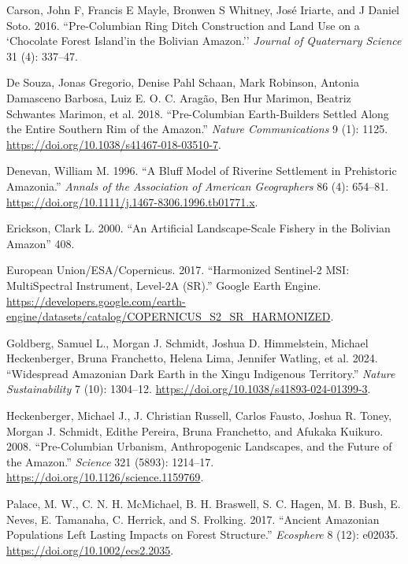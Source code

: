 \documentclass[
  letterpaper,
  DIV=11,
  numbers=noendperiod]{scrartcl}
\newlength{\cslhangindent}
\newenvironment{CSLReferences}[2] %
 {\begin{list}{}{%
  \setlength{\itemindent}{0pt}
  \setlength{\leftmargin}{0pt}
  \setlength{\parsep}{0pt}
  \ifodd #1
   \setlength{\leftmargin}{\cslhangindent}
   \setlength{\itemindent}{-1\cslhangindent}
  \fi
  \setlength{\itemsep}{#2\baselineskip}}}
 {\end{list}}
\begin{document}
\label{refs}
\begin{CSLReferences}{1}{0}
Carson, John F, Francis E Mayle, Bronwen S Whitney, José Iriarte, and J
Daniel Soto. 2016. {``Pre-Columbian Ring Ditch Construction and Land Use
on a `Chocolate Forest Island'in the Bolivian Amazon.''} \emph{Journal
of Quaternary Science} 31 (4): 337--47.

De Souza, Jonas Gregorio, Denise Pahl Schaan, Mark Robinson, Antonia
Damasceno Barbosa, Luiz E. O. C. Aragão, Ben Hur Marimon, Beatriz
Schwantes Marimon, et al. 2018. {``Pre-Columbian Earth-Builders Settled
Along the Entire Southern Rim of the Amazon.''} \emph{Nature
Communications} 9 (1): 1125.
\url{https://doi.org/10.1038/s41467-018-03510-7}.

Denevan, William M. 1996. {``A Bluff Model of Riverine Settlement in
Prehistoric Amazonia.''} \emph{Annals of the Association of American
Geographers} 86 (4): 654--81.
\url{https://doi.org/10.1111/j.1467-8306.1996.tb01771.x}.

Erickson, Clark L. 2000. {``An Artificial Landscape-Scale Fishery in the
Bolivian Amazon''} 408.

European Union/ESA/Copernicus. 2017. {``Harmonized {Sentinel-2} {MSI}:
{MultiSpectral} {Instrument}, {Level-2A} ({SR}).''} Google Earth Engine.
\url{https://developers.google.com/earth-engine/datasets/catalog/COPERNICUS_S2_SR_HARMONIZED}.

Goldberg, Samuel L., Morgan J. Schmidt, Joshua D. Himmelstein, Michael
Heckenberger, Bruna Franchetto, Helena Lima, Jennifer Watling, et al.
2024. {``Widespread Amazonian Dark Earth in the Xingu Indigenous
Territory.''} \emph{Nature Sustainability} 7 (10): 1304--12.
\url{https://doi.org/10.1038/s41893-024-01399-3}.

Heckenberger, Michael J., J. Christian Russell, Carlos Fausto, Joshua R.
Toney, Morgan J. Schmidt, Edithe Pereira, Bruna Franchetto, and Afukaka
Kuikuro. 2008. {``Pre-Columbian Urbanism, Anthropogenic Landscapes, and
the Future of the Amazon.''} \emph{Science} 321 (5893): 1214--17.
\url{https://doi.org/10.1126/science.1159769}.

Palace, M. W., C. N. H. McMichael, B. H. Braswell, S. C. Hagen, M. B.
Bush, E. Neves, E. Tamanaha, C. Herrick, and S. Frolking. 2017.
{``Ancient Amazonian Populations Left Lasting Impacts on Forest
Structure.''} \emph{Ecosphere} 8 (12): e02035.
\url{https://doi.org/10.1002/ecs2.2035}.


\end{CSLReferences}
\end{document}
